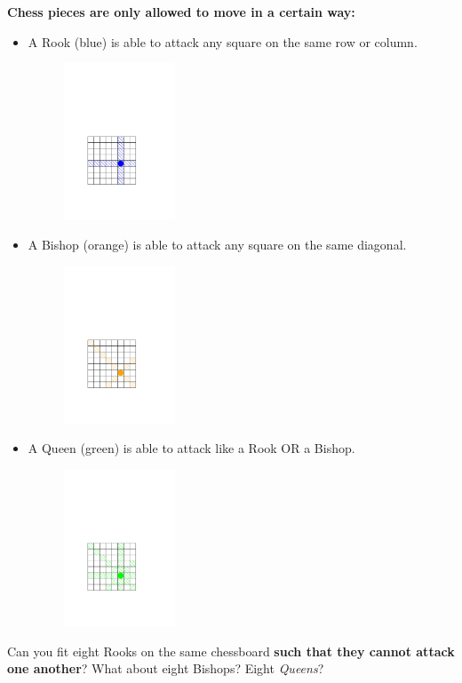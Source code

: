 
\newcommand{\activityname}{
  Check Mates
}
\newcommand{\subtitle}{
  Graph Theory for Grandmasters
}


\noindent\textbf{Chess pieces are only allowed to move in a certain way:}

\begin{itemize}
\item A Rook (blue) is able to attack any square on the same row or column.
\begin{figure}[h]
\begin{center}
\includegraphics[width=1.3in]{RookAttack.pdf}
\end{center}
\end{figure}
\item A Bishop (orange) is able to attack any square on the same diagonal.
\begin{figure}[h]
\begin{center}
\includegraphics[width=1.3in]{BishopAttack.pdf}
\end{center}
\end{figure}
\item A Queen (green) is able to attack like a Rook OR a Bishop.
\begin{figure}[h]
\begin{center}
\includegraphics[width=1.3in]{QueenAttack.pdf}
\end{center}
\end{figure}
\end{itemize}

\noindent Can you fit eight Rooks on the same chessboard \textbf{such that they cannot attack one another}? What about eight Bishops? Eight \textit{Queens}?

